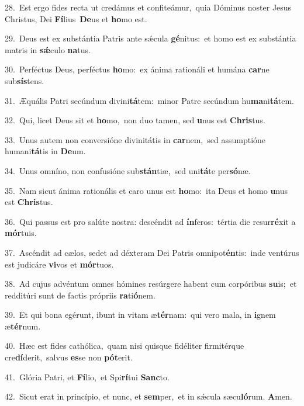 {\numbfont\textcolor{\numbcolor}{28.}}~Est ergo fides recta ut credámus et confiteámur,~\dagger quia Dóminus noster Jesus Christus, Dei \textbf{Fí}\-lius~\star \textbf{De}\-us et \textbf{ho}\-mo est.\par
{\numbfont\textcolor{\numbcolor}{29.}}~Deus est ex substántia Patris ante sǽcula \textbf{gé}\-nitus:~\star et homo est ex substántia matris in \textbf{sǽ}\-culo \textbf{na}\-tus.\par
{\numbfont\textcolor{\numbcolor}{30.}}~Perféctus Deus, perféctus \textbf{ho}\-mo:~\star ex ánima rationáli et humána \textbf{car}\-ne sub\-\textbf{sís}\-tens.\par
{\numbfont\textcolor{\numbcolor}{31.}}~Æquális Patri secúndum divini\-\textbf{tá}\-tem:~\star minor Patre secúndum hu\-\textbf{ma}\-ni\-\textbf{tá}\-tem.\par
{\numbfont\textcolor{\numbcolor}{32.}}~Qui, licet Deus sit et \textbf{ho}\-mo,~\star non duo tamen, sed \textbf{u}\-nus est \textbf{Chris}\-tus.\par
{\numbfont\textcolor{\numbcolor}{33.}}~Unus autem non conversióne divinitátis in \textbf{car}\-nem,~\star sed assumptióne humani\-\textbf{tá}\-tis in \textbf{De}\-um.\par
{\numbfont\textcolor{\numbcolor}{34.}}~Unus omníno, non confusióne sub\-\textbf{stán}\-tiæ,~\star sed uni\-\textbf{tá}\-te per\-\textbf{só}\-næ.\par
{\numbfont\textcolor{\numbcolor}{35.}}~Nam sicut ánima rationális et caro unus est \textbf{ho}\-mo:~\star ita Deus et homo \textbf{u}\-nus est \textbf{Chris}\-tus.\par
{\numbfont\textcolor{\numbcolor}{36.}}~Qui passus est pro salúte nostra: descéndit ad \textbf{ín}\-feros:~\star tértia die resur\-\textbf{ré}\-xit a \textbf{mór}\-tuis.\par
{\numbfont\textcolor{\numbcolor}{37.}}~Ascéndit ad cælos, sedet ad déxteram Dei Patris omnipot\-\textbf{én}\-tis:~\star inde ventúrus est judicáre \textbf{vi}\-vos et \textbf{mór}\-tuos.\par
{\numbfont\textcolor{\numbcolor}{38.}}~Ad cujus advéntum omnes hómines resúrgere habent cum corpóribus \textbf{su}\-is;~\star et redditúri sunt de factis própriis \textbf{ra}\-ti\-\textbf{ó}\-nem.\par
{\numbfont\textcolor{\numbcolor}{39.}}~Et qui bona egérunt, ibunt in vitam æ\-\textbf{tér}\-nam:~\star qui vero mala, in \textbf{i}\-gnem æ\-\textbf{tér}\-num.\par
{\numbfont\textcolor{\numbcolor}{40.}}~Hæc est fides cathólica,~\dagger quam nisi quisque fidéliter firmitérque cre\-\textbf{dí}\-derit,~\star salvus \textbf{es}\-se non \textbf{pót}\-erit.\par
{\numbfont\textcolor{\numbcolor}{41.}}~Glória Patri, et \textbf{Fí}\-lio,~\star et Spi\-\textbf{rí}\-tui \textbf{Sanc}\-to.\par
{\numbfont\textcolor{\numbcolor}{42.}}~Sicut erat in princípio, et nunc, et \textbf{sem}\-per,~\star et in sǽcula sæcu\-\textbf{ló}\-rum. \textbf{A}\-men.\par
